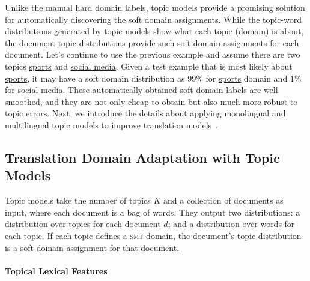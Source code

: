 Unlike the manual hard domain labels, topic models provide a promising
solution for automatically discovering the soft domain
assignments. While the topic-word distributions generated by topic
models show what each topic (domain) is about, the document-topic
distributions provide such soft domain assignments for each
document. Let's continue to use the previous example and assume there
are two topics \underline{sports} and \underline{social media}. Given
a test example that is most likely about \underline{sports}, it may
have a soft domain distribution as $99\%$ for \underline{sports}
domain and $1\%$ for \underline{social media}. These automatically
obtained soft domain labels are well smoothed, and they are not only
cheap to obtain but also much more robust to topic errors. Next, we
introduce the details about applying monolingual and multilingual
topic models to improve translation models~\citep{Eidelman-12,hu-14}.


\subsection{Translation Domain Adaptation with Topic Models}

Topic models take the number of topics $K$ and a collection of
documents as input, where each document is a bag of words. They output
two distributions: a distribution over topics for each document $d$;
and a distribution over words for each topic. If each topic defines a
\textsc{smt} domain, the document's topic distribution is a soft
domain assignment for that document.


\paragraph{Topical Lexical Features}

